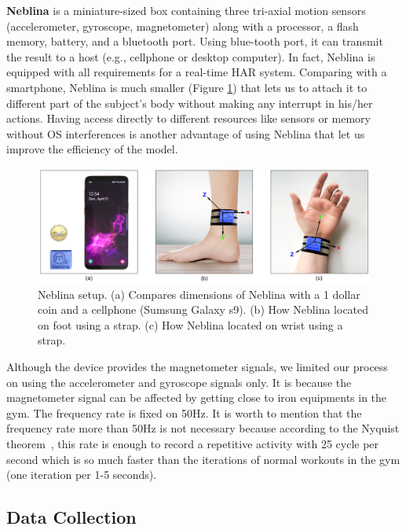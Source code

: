 \documentclass[journal,article,submit,moreauthors,pdftex]{Definitions/mdpi}
\begin{document}
\noindent \textbf{Neblina} is a miniature-sized box containing three tri-axial motion sensors (accelerometer, gyroscope, magnetometer) along with a processor, a flash memory, battery, and a bluetooth port. Using blue-tooth port, it can transmit the result to a host (e.g., cellphone or desktop computer).  In fact, Neblina is equipped with all requirements for a real-time HAR system. Comparing with a smartphone, Neblina is much smaller (Figure \ref{neblina_setup}) that lets us to attach it to different part of the subject's body without making any interrupt in his/her actions\cite{de2018comparative}. Having access directly to different resources like sensors or memory without OS interferences is another advantage of using Neblina that let us improve the efficiency of the model.
\begin{figure}[H]
	\centering
	\includegraphics[width=10 cm]{Definitions/images/neblina_setup.jpg}
	\caption{Neblina setup. (a) Compares dimensions of Neblina with a 1 dollar coin and a cellphone (Sumsung Galaxy s9). (b) How Neblina located on foot using a strap. (c) How Neblina located on wrist using a strap.}
	\label{neblina_setup}
\end{figure} 

Although the device provides the magnetometer signals, we limited our process on using the accelerometer and gyroscope signals only. It is because the magnetometer signal can be affected by getting close to iron equipments in the gym. The frequency rate is fixed on 50Hz. It is worth to mention that the frequency rate more than 50Hz is not necessary because according to the Nyquist theorem~\cite{mazo1975faster}, this rate is enough to record a repetitive activity with 25 cycle per second which is so much faster than the iterations of normal workouts in the gym (one iteration per 1-5 seconds).

\subsection{Data Collection}
\end{document}
